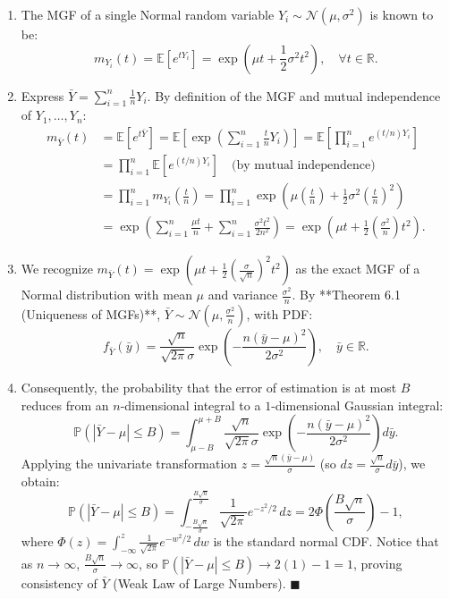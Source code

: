 \documentclass[11pt, letterpaper]{article}
\theoremstyle{definition}
\theoremstyle{remark}
\newcommand{\R}{\mathbb{R}}
\newcommand{\E}{\mathbb{E}}
\newcommand{\Prob}{\mathbb{P}}
\begin{document}
\begin{enumerate}[label=\textbf{Step \arabic*:}]
    \item The MGF of a single Normal random variable $Y_i \sim \mathcal{N}(\mu, \sigma^2)$ is known to be:
    \[
        m_{Y_i}(t) = \E[e^{t Y_i}] = \exp\left(\mu t + \frac{1}{2}\sigma^2 t^2\right), \quad \forall t \in \R.
    \]
    \item Express $\bar{Y} = \sum_{i=1}^n \frac{1}{n} Y_i$. By definition of the MGF and mutual independence of $Y_1, \dots, Y_n$:
    \begin{align*}
        m_{\bar{Y}}(t) &= \E\left[e^{t \bar{Y}}\right] = \E\left[\exp\left(\sum_{i=1}^n \frac{t}{n} Y_i\right)\right] = \E\left[\prod_{i=1}^n e^{(t/n) Y_i}\right] \\
        &= \prod_{i=1}^n \E\left[e^{(t/n) Y_i}\right] \quad \text{(by mutual independence)} \\
        &= \prod_{i=1}^n m_{Y_i}\left(\frac{t}{n}\right) = \prod_{i=1}^n \exp\left(\mu\left(\frac{t}{n}\right) + \frac{1}{2}\sigma^2\left(\frac{t}{n}\right)^2\right) \\
        &= \exp\left(\sum_{i=1}^n \frac{\mu t}{n} + \sum_{i=1}^n \frac{\sigma^2 t^2}{2n^2}\right) = \exp\left(\mu t + \frac{1}{2}\left(\frac{\sigma^2}{n}\right) t^2\right).
    \end{align*}
    \item We recognize $m_{\bar{Y}}(t) = \exp\left(\mu t + \frac{1}{2}\left(\frac{\sigma}{\sqrt{n}}\right)^2 t^2\right)$ as the exact MGF of a Normal distribution with mean $\mu$ and variance $\frac{\sigma^2}{n}$. By **Theorem 6.1 (Uniqueness of MGFs)**, $\bar{Y} \sim \mathcal{N}\left(\mu, \frac{\sigma^2}{n}\right)$, with PDF:
    \[
        f_{\bar{Y}}(\bar{y}) = \frac{\sqrt{n}}{\sqrt{2\pi}\sigma} \exp\left(-\frac{n(\bar{y} - \mu)^2}{2\sigma^2}\right), \quad \bar{y} \in \R.
    \]
    \item Consequently, the probability that the error of estimation is at most $B$ reduces from an $n$-dimensional integral to a $1$-dimensional Gaussian integral:
    \[
        \Prob(|\bar{Y} - \mu| \le B) = \int_{\mu - B}^{\mu + B} \frac{\sqrt{n}}{\sqrt{2\pi}\sigma} \exp\left(-\frac{n(\bar{y} - \mu)^2}{2\sigma^2}\right) d\bar{y}.
    \]
    Applying the univariate transformation $z = \frac{\sqrt{n}(\bar{y} - \mu)}{\sigma}$ (so $dz = \frac{\sqrt{n}}{\sigma} d\bar{y}$), we obtain:
    \[
        \Prob(|\bar{Y} - \mu| \le B) = \int_{-\frac{B\sqrt{n}}{\sigma}}^{\frac{B\sqrt{n}}{\sigma}} \frac{1}{\sqrt{2\pi}} e^{-z^2/2} \, dz = 2\Phi\left(\frac{B\sqrt{n}}{\sigma}\right) - 1,
    \]
    where $\Phi(z) = \int_{-\infty}^z \frac{1}{\sqrt{2\pi}} e^{-w^2/2} \, dw$ is the standard normal CDF. Notice that as $n \to \infty$, $\frac{B\sqrt{n}}{\sigma} \to \infty$, so $\Prob(|\bar{Y} - \mu| \le B) \to 2(1) - 1 = 1$, proving consistency of $\bar{Y}$ (Weak Law of Large Numbers). \hfill $\blacksquare$
\end{enumerate}
\end{document}
